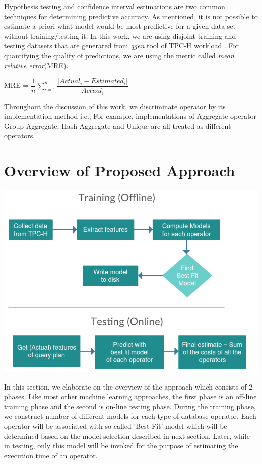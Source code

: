 \documentclass{article}
\begin{document}
\begin{multicols}{2}
	Hypothesis testing and confidence interval estimations are two common
techniques for determining predictive accuracy. As mentioned, 
it is not possible to estimate a priori what model would be
most predictive for a given data set without training/testing it. In this work, we are using
disjoint training and testing datasets that are generated from \textit{qgen} tool of TPC-H workload 		\cite{TPCH}. For quantifying the quality of predictions, we are using the metric called \textit{mean relative error}(MRE).
	\begin{center}
	MRE  = $\dfrac{1}{n} \sum\limits_{i=1}^n \dfrac{\left| Actual_{i} - Estimated_{i} \right|}{Actual_{i}}$
	\end{center}

Throughout the discussion of this work, we discriminate operator by its implementation method i.e., For example, implementations of Aggregate operator Group Aggregate, Hash Aggregate and Unique are all treated as different operators.

	\section{Overview of Proposed Approach}
	
	\includegraphics[scale=0.4]{training.png}

	In this section, we elaborate on the overview of the approach which consists of 2 phases. Like 
	most other machine learning approaches, the first phase is an off-line training phase and the 
	second is on-line testing phase.
	During the training phase, we construct number of different 
	models for each type of database operator. Each operator will be associated with so called 'Best-Fit' 		model which will be determined 
	based on the model selection described in next section. Later, while in testing, only this model will 		be invoked for the purpose of estimating the execution time of an operator. 


\end{multicols}
\end{document}
